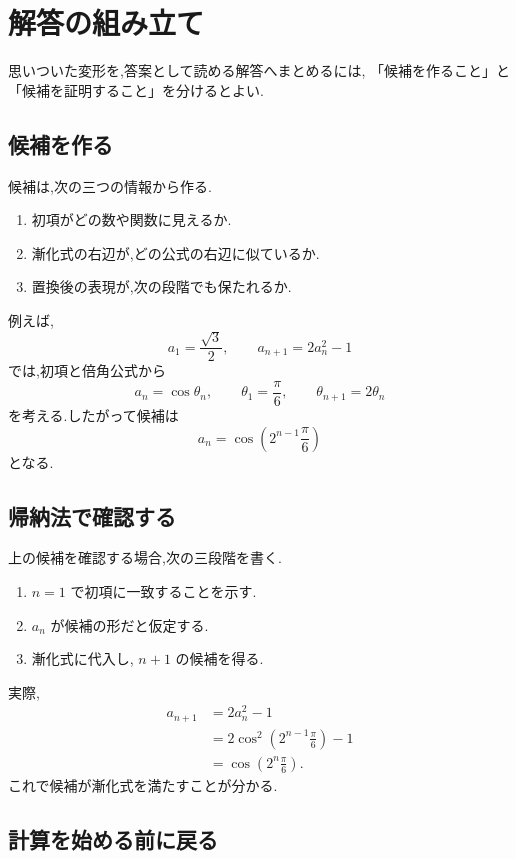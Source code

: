 
\section{解答の組み立て}

思いついた変形を,答案として読める解答へまとめるには,
「候補を作ること」と「候補を証明すること」を分けるとよい.

\subsection{候補を作る}

候補は,次の三つの情報から作る.

\begin{enumerate}
  \item 初項がどの数や関数に見えるか.
  \item 漸化式の右辺が,どの公式の右辺に似ているか.
  \item 置換後の表現が,次の段階でも保たれるか.
\end{enumerate}

例えば,
\[
  a_1=\frac{\sqrt{3}}{2},\qquad
  a_{n+1}=2a_n^2-1
\]
では,初項と倍角公式から
\[
  a_n=\cos\theta_n,\qquad
  \theta_1=\frac{\pi}{6},\qquad
  \theta_{n+1}=2\theta_n
\]
を考える.したがって候補は
\[
  a_n=\cos\left(2^{n-1}\frac{\pi}{6}\right)
\]
となる.

\subsection{帰納法で確認する}

上の候補を確認する場合,次の三段階を書く.

\begin{enumerate}
  \item $n=1$ で初項に一致することを示す.
  \item $a_n$ が候補の形だと仮定する.
  \item 漸化式に代入し, $n+1$ の候補を得る.
\end{enumerate}

実際,
\begin{align*}
  a_{n+1}
    &=2a_n^2-1\\
    &=2\cos^2\left(2^{n-1}\frac{\pi}{6}\right)-1\\
    &=\cos\left(2^n\frac{\pi}{6}\right).
\end{align*}
これで候補が漸化式を満たすことが分かる.

\subsection{計算を始める前に戻る}

